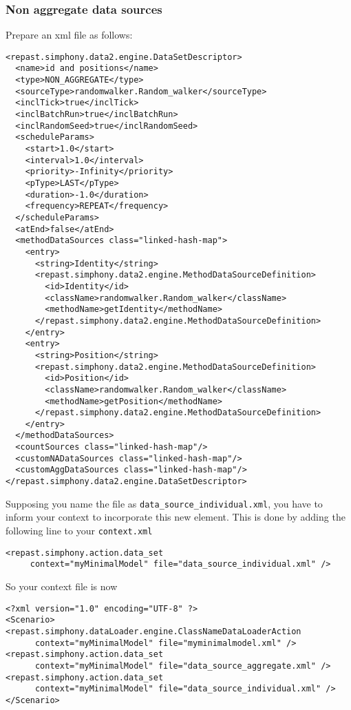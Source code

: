 \documentclass{article}
\begin{document}
\subsubsection{Non aggregate data sources}
Prepare an xml file as follows:

\begin{verbatim}
<repast.simphony.data2.engine.DataSetDescriptor>
  <name>id and positions</name>
  <type>NON_AGGREGATE</type>
  <sourceType>randomwalker.Random_walker</sourceType>
  <inclTick>true</inclTick>
  <inclBatchRun>true</inclBatchRun>
  <inclRandomSeed>true</inclRandomSeed>
  <scheduleParams>
    <start>1.0</start>
    <interval>1.0</interval>
    <priority>-Infinity</priority>
    <pType>LAST</pType>
    <duration>-1.0</duration>
    <frequency>REPEAT</frequency>
  </scheduleParams>
  <atEnd>false</atEnd>
  <methodDataSources class="linked-hash-map">
    <entry>
      <string>Identity</string>
      <repast.simphony.data2.engine.MethodDataSourceDefinition>
        <id>Identity</id>
        <className>randomwalker.Random_walker</className>
        <methodName>getIdentity</methodName>
      </repast.simphony.data2.engine.MethodDataSourceDefinition>
    </entry>
    <entry>
      <string>Position</string>
      <repast.simphony.data2.engine.MethodDataSourceDefinition>
        <id>Position</id>
        <className>randomwalker.Random_walker</className>
        <methodName>getPosition</methodName>
      </repast.simphony.data2.engine.MethodDataSourceDefinition>
    </entry>
  </methodDataSources>
  <countSources class="linked-hash-map"/>
  <customNADataSources class="linked-hash-map"/>
  <customAggDataSources class="linked-hash-map"/>
</repast.simphony.data2.engine.DataSetDescriptor>
\end{verbatim}

Supposing you name the file as \verb+data_source_individual.xml+, you have to inform your context to incorporate this new element. This is done by adding the following line to your \verb+context.xml+

\begin{verbatim}
<repast.simphony.action.data_set 
     context="myMinimalModel" file="data_source_individual.xml" />
\end{verbatim}

So your context file is now

\begin{verbatim}
<?xml version="1.0" encoding="UTF-8" ?>
<Scenario>
<repast.simphony.dataLoader.engine.ClassNameDataLoaderAction 
      context="myMinimalModel" file="myminimalmodel.xml" />
<repast.simphony.action.data_set 
      context="myMinimalModel" file="data_source_aggregate.xml" />
<repast.simphony.action.data_set 
      context="myMinimalModel" file="data_source_individual.xml" />
</Scenario>
\end{verbatim}
\end{document}

